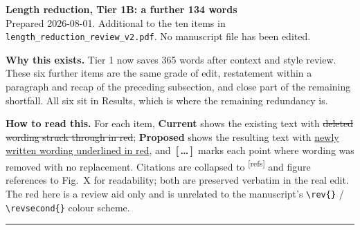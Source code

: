 \documentclass[11pt,a4paper]{article}
\newcommand{\citep}[1]{\textsuperscript{[refs]}}
\newcommand{\figref}[1]{Fig.~X}
\newcommand{\cutx}[1]{{\color{CutRed}\sout{#1}}}
\newcommand{\newx}[1]{{\color{CutRed}\uline{#1}}}
\newcommand{\cutmark}{{\color{CutRed}\,\textbf{[\,\ldots\,]}\,}}
\begin{document}
\begin{center}{\Large\textbf{Length reduction, Tier 1B: a further 134 words}}\\[0.3em]
{\normalsize Prepared 2026-08-01. Additional to the ten items in \texttt{length\_reduction\_review\_v2.pdf}. No manuscript file has been edited.}\end{center}
\vspace{0.5em}
{\small\textbf{Why this exists.} Tier 1 now saves 365 words after context and style review. These six further items are the same grade of
edit, restatement within a paragraph and recap of the preceding subsection, and close part of the remaining shortfall.
All six sit in Results, which is where the remaining redundancy is.

\textbf{How to read this.} For each item, \textbf{Current} shows the existing text with
\cutx{deleted wording struck through in red}; \textbf{Proposed} shows the resulting text with
\newx{newly written wording underlined in red}, and \cutmark{} marks each point where wording was removed with no replacement. Citations are collapsed to \citep{} and figure
references to \figref{} for readability; both are preserved verbatim in the real edit.
The red here is a review aid only and is unrelated to the manuscript's
\texttt{\textbackslash rev\{\}} / \texttt{\textbackslash revsecond\{\}} colour scheme.}\par
\vspace{0.3em}
\noindent\rule{\linewidth}{0.4pt}
\end{document}
